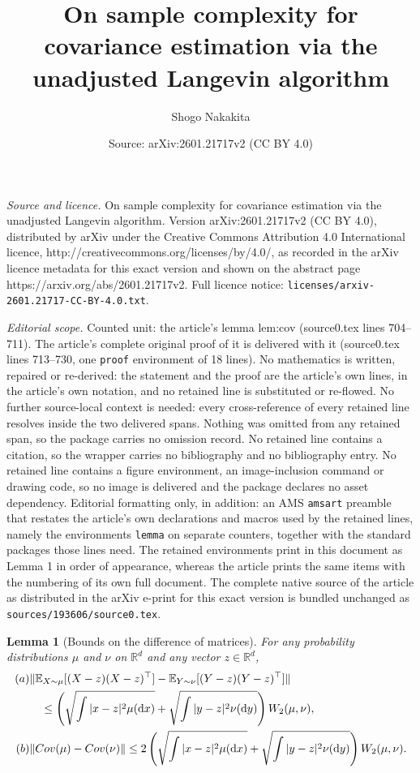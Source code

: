 \documentclass[10pt,a4paper]{amsart}
\title{On sample complexity for covariance estimation via the unadjusted Langevin algorithm}
\author{Shogo Nakakita}
\date{Source: arXiv:2601.21717v2 (CC BY 4.0)}
\newtheorem{lemma}{Lemma}
\newcommand{\Cov}{\textnormal{Cov}}
\newcommand{\E}{\mathbb{E}}
\newcommand{\R}{\mathbb{R}}
\newcommand{\diff}{\mathrm{d}}
\begin{document}
\maketitle

\noindent\emph{Source and licence.} On sample complexity for covariance estimation via the unadjusted Langevin algorithm. Version arXiv:2601.21717v2 (CC BY 4.0), distributed by arXiv under the Creative Commons Attribution 4.0 International licence, http://creativecommons.org/licenses/by/4.0/, as recorded in the arXiv licence metadata for this exact version and shown on the abstract page https://arxiv.org/abs/2601.21717v2. Full licence notice: \texttt{licenses/arxiv-2601.21717-CC-BY-4.0.txt}.\par\smallskip

\noindent\textit{Editorial scope.} Counted unit: the article's lemma lem:cov (source0.tex lines 704--711). The article's complete original proof of it is delivered with it (source0.tex lines 713--730, one \texttt{proof} environment of 18 lines). No mathematics is written, repaired or re-derived: the statement and the proof are the article's own lines, in the article's own notation, and no retained line is substituted or re-flowed.  No further source-local context is needed: every cross-reference of every retained line resolves inside the two delivered spans.  Nothing was omitted from any retained span, so the package carries no omission record.  No retained line contains a citation, so the wrapper carries no bibliography and no bibliography entry.  No retained line contains a figure environment, an image-inclusion command or drawing code, so no image is delivered and the package declares no asset dependency.  Editorial formatting only, in addition: an AMS \texttt{amsart} preamble that restates the article's own declarations and macros used by the retained lines, namely the environments \texttt{lemma} on separate counters, together with the standard packages those lines need.  The retained environments print in this document as Lemma 1 in order of appearance, whereas the article prints the same items with the numbering of its own full document.  The complete native source of the article as distributed in the arXiv e-print for this exact version is bundled unchanged as \texttt{sources/193606/source0.tex}.
\begin{lemma}[Bounds on the difference of matrices]\label{lem:cov}
    For any probability distributions $\mu$ and $\nu$ on $\R^{d}$ and any vector $z\in\R^{d}$,
    \begin{align*}
        \textnormal{(a) }&\|\E_{X\sim\mu}[(X-z)(X-z)^{\top}]-\E_{Y\sim\nu}[(Y-z)(Y-z)^{\top}]\|\\
        &\quad\le \left(\sqrt{\int|x-z|^{2}\mu(\diff x)}+\sqrt{\int|y-z|^{2}\nu(\diff y)}\right)W_{2}(\mu,\nu),\\
        \textnormal{(b) }&\|\Cov(\mu)-\Cov(\nu)\|\le 2\left(\sqrt{\int|x-z|^{2}\mu(\diff x)}+\sqrt{\int|y-z|^{2}\nu(\diff y)}\right)W_{2}(\mu,\nu).
    \end{align*}
\end{lemma}
\end{document}
